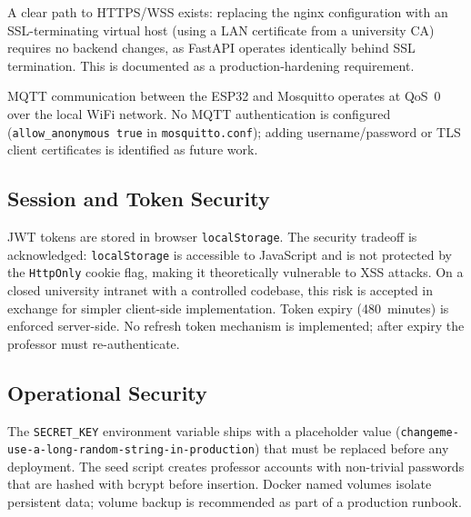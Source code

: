 A clear path to HTTPS/WSS exists: replacing the nginx configuration
with an SSL-terminating virtual host (using a LAN certificate from a
university CA) requires no backend changes, as FastAPI operates
identically behind SSL termination.  This is documented as a
production-hardening requirement.

MQTT communication between the ESP32 and Mosquitto operates at QoS~0
over the local WiFi network.  No MQTT authentication is configured
(\texttt{allow\_anonymous true} in \texttt{mosquitto.conf}); adding
username/password or TLS client certificates is identified as future
work.

\subsection{Session and Token Security}
\label{subsec:token_security}

JWT tokens are stored in browser \texttt{localStorage}.  The security
tradeoff is acknowledged: \texttt{localStorage} is accessible to
JavaScript and is not protected by the \texttt{HttpOnly} cookie flag,
making it theoretically vulnerable to XSS attacks.  On a closed
university intranet with a controlled codebase, this risk is accepted
in exchange for simpler client-side implementation.  Token expiry
(480~minutes) is enforced server-side.  No refresh token mechanism is
implemented; after expiry the professor must re-authenticate.

\subsection{Operational Security}
\label{subsec:ops_security}

The \texttt{SECRET\_KEY} environment variable ships with a placeholder
value (\texttt{changeme-use-a-long-random-string-in-production}) that
must be replaced before any deployment.  The seed script creates
professor accounts with non-trivial passwords that are hashed with
bcrypt before insertion.  Docker named volumes isolate persistent data;
volume backup is recommended as part of a production runbook.
